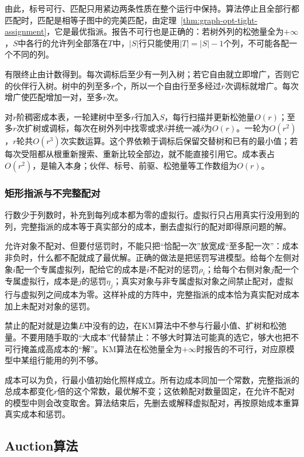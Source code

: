 由此，标号可行、匹配只用紧边两条性质在整个运行中保持。算法停止且全部行都匹配时，匹配是相等子图中的完美匹配，由定理~\ref{thm:graph-opt-tight-assignment}，它是最优指派。报告不可行也是正确的：若树外列的松弛量全为$+\infty$，$S$中各行的允许列全部落在$T$中，$|S|$行只能使用$|T|=|S|-1$个列，不可能各配一个不同的列。

有限终止由计数得到。每次调标后至少有一列入树；若它自由就立即增广，否则它的伙伴行入树。树中的列至多$r$个，所以一个自由行至多经过$r$次调标就增广。每次增广使匹配增加一对，至多$r$次。

对$r$阶稠密成本表，一轮建树中至多$r$行加入$S$，每行扫描并更新松弛量$O(r)$；至多$r$次扩树或调标，每次在树外列中找零或求$\delta$并统一减$\delta$为$O(r)$。一轮为$O(r^2)$，$r$轮共$O(r^3)$次实数运算。这个界依赖于调标后保留交替树和已有的最小值；若每次受阻都从根重新搜索、重新比较全部边，就不能直接引用它。成本表占$O(r^2)$，是输入本身；伙伴、标号、前驱、松弛量等工作数组为$O(r)$。

\subsubsection{矩形指派与不完整配对}
\label{sec:graph-opt-assign-rectangular}

行数少于列数时，补充到每列成本都为零的虚拟行。虚拟行只占用真实行没用到的列，完整指派的成本等于真实部分的成本，删去虚拟行的配对即得原问题的解。

允许对象不配对、但要付惩罚时，不能只把“恰配一次”放宽成“至多配一次”：成本非负时，什么都不配就成了最优解。正确的做法是把惩罚写进模型。给每个左侧对象$i$配一个专属虚拟列，配给它的成本是$i$不配对的惩罚$\rho_i$；给每个右侧对象$j$配一个专属虚拟行，成本是$j$的惩罚$\eta_j$；真实对象与非专属虚拟对象之间禁止配对，虚拟行与虚拟列之间成本为零。这样补成的方阵中，完整指派的成本恰为真实配对成本加上未配对对象的惩罚。

禁止的配对就是边集$E$中没有的边，在KM算法中不参与行最小值、扩树和松弛量。不要用随手取的“大成本”代替禁止：不够大时算法可能真的选它，够大也把不可行掩盖成高成本的“解”。KM算法在松弛量全为$+\infty$时报告的不可行，对应原模型中某组行能用的列不够。

成本可以为负，行最小值初始化照样成立。所有边成本同加一个常数，完整指派的总成本都变化$r$倍的这个常数，最优解不变；这依赖配对数量固定，在允许不配对的模型中则会改变取舍。算法结束后，先删去或解释虚拟配对，再按原始成本重算真实成本和惩罚。

\subsection{Auction算法}
\label{sec:graph-opt-auction}

